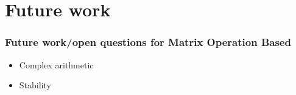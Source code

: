 \documentclass[12pt]{beamer}
\begin{document}
    \section{Future work}
    \begin{frame}
        \frametitle{Future work/open questions for Matrix Operation Based}
        \begin{itemize}
            \item Complex arithmetic
            \item Stability
        \end{itemize}
    \end{frame}
\end{document}

